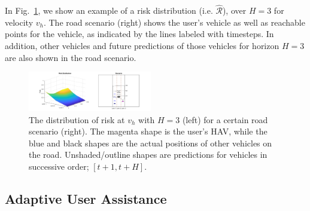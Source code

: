 \documentclass[letterpaper, 10 pt, conference]{ieeeconf}  %
\newcommand\NB[1]{$\spadesuit$\footnote{NB: #1}}
\begin{document}
 In Fig.~\ref{fig:riskd}, we show an example of a risk distribution (i.e. $\hat{\mathcal{R}}$), over $H=3$ for velocity $v_h$. The road scenario (right) shows the user's vehicle as well as reachable points for the vehicle, as indicated by the lines labeled with timesteps. In addition, other vehicles and future predictions of those vehicles for horizon $H=3$ are also shown in the road scenario.

\begin{figure}[ht]
    \includegraphics[width=0.48\textwidth]{fig/assist2.png}
    \caption{The distribution of risk at $v_h$ with $H = 3$ (left) for a certain road scenario (right). The magenta shape is the user's HAV, while the blue and black shapes are the actual positions of other vehicles on the road. Unshaded/outline shapes are predictions for vehicles in successive order; $[t+1,t+H]$.}
    \label{fig:riskd}
\end{figure}




\subsection{Adaptive User Assistance}

\end{document}
